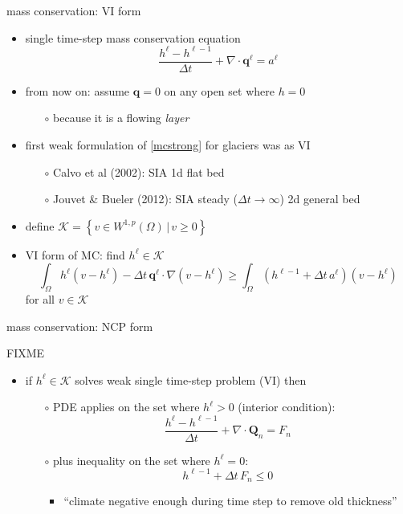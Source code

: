 \documentclass[xcolor={dvipsnames}]{beamer}
\newcommand\bq{\mathbf{q}}
\newcommand\bQ{\mathbf{Q}}
\newcommand\Div{\nabla\cdot}
\newcommand\grad{\nabla}
\begin{document}
\begin{frame}{mass conservation: VI form}

\begin{itemize}
\item single time-step mass conservation equation
\begin{equation}
\frac{h^\ell - h^{\ell-1}}{\Delta t} + \Div \bq^\ell = a^\ell \tag{MC} \label{mcstrong}
\end{equation}
\item from now on: assume $\bq=0$ on any open set where $h=0$
    \begin{itemize}
    \item[$\circ$] because it is a flowing \emph{layer}
    \end{itemize}
\item first weak formulation of \ref{mcstrong} for glaciers was as VI
    \begin{itemize}
    \item[$\circ$] Calvo et al (2002): SIA 1d flat bed
    \item[$\circ$] Jouvet \& Bueler (2012): SIA steady ($\Delta t\to \infty$) 2d general bed
    \end{itemize}
\item define $\mathcal{K} = \left\{v \in W^{1,p}(\Omega) \,\Big|\, v\ge 0\right\}$
\item VI form of MC: find $h^\ell\in\mathcal{K}$
    $$\int_\Omega h^\ell (v - h^\ell) - \Delta t\, \bq^\ell \cdot \grad(v - h^\ell) \ge \int_\Omega \left(h^{\ell-1} + \Delta t\, a^\ell\right) (v - h^\ell)$$
for all $v \in \mathcal{K}$
\end{itemize}
\end{frame}


\begin{frame}{mass conservation: NCP form}

FIXME

\begin{itemize}
\item if $h^\ell \in \mathcal{K}$ solves weak single time-step problem (VI) then
  
      \medskip
	  \begin{itemize}
	  \item[$\circ$] PDE applies on the set where $h^\ell>0$ (interior condition):
	    $$\frac{h^\ell - h^{\ell-1}}{\Delta t} + \Div \bQ_n = F_n$$
	  \item[$\circ$] plus inequality on the set where $h^\ell = 0$:
	    $$h^{\ell-1} + \Delta t\, F_n \le 0$$
	    \vspace{-6mm}
	    \begin{itemize}
	    \item ``climate negative enough during time step to remove old thickness''
	    \end{itemize}
	  \end{itemize}
\end{itemize}
\end{frame}
\end{document}
